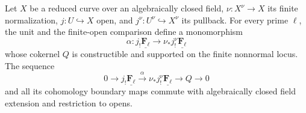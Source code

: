 \begin{lemma}
\label{lemma:weil-pbc-normalization-exact-sequence}
Let $X$ be a reduced curve over an algebraically closed field,
$\nu:X^\nu\to X$ its finite normalization, $j:U\hookrightarrow X$ open,
and $j^\nu:U^\nu\hookrightarrow X^\nu$ its pullback.  For every prime
$\ell$, the unit and the finite-open comparison define a monomorphism
\[
 \alpha:j_!\underline{\mathbf F_\ell}\longrightarrow
 \nu_*j^\nu_!\underline{\mathbf F_\ell}
\]
whose cokernel $Q$ is constructible and supported on the finite nonnormal
locus.  The sequence
\[
 0\longrightarrow j_!\underline{\mathbf F_\ell}
 \xrightarrow{\alpha}\nu_*j^\nu_!\underline{\mathbf F_\ell}
 \longrightarrow Q\longrightarrow0
\]
and all its cohomology boundary maps commute with algebraically closed field
extension and restriction to opens.
\end{lemma}
